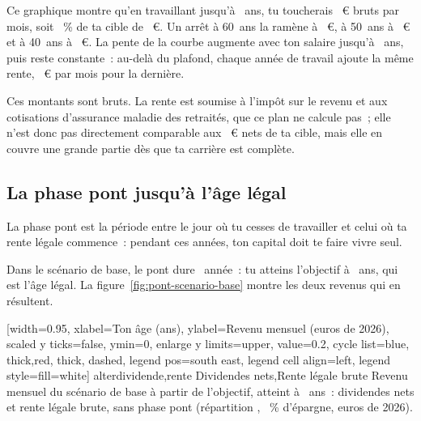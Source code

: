 Ce graphique montre qu'en travaillant jusqu'\`a \AgeLegal~ans, tu toucherais \RenteBeiZielalter~€
bruts par mois, soit \RenteLegalePartCible~\% de ta cible de \ZielMonat~€. Un arr\^et \`a 60~ans la
ram\`ene \`a \RenteArretSechzig~€, \`a 50~ans \`a \RenteArretFuenfzig~€ et \`a 40~ans \`a
\RenteArretVierzig~€. La pente de la courbe augmente avec ton salaire jusqu'\`a \AgePlafondRv~ans,
puis reste constante~: au-del\`a du plafond, chaque ann\'ee de travail ajoute la m\^eme rente,
\RenteDerniereAnnee~€ par mois pour la derni\`ere. 

Ces montants sont bruts. La rente est soumise \`a l'imp\^ot sur le revenu et aux cotisations
d'assurance maladie des retrait\'es, que ce plan ne calcule pas~; elle n'est donc pas directement
comparable aux \ZielMonat~€ nets de ta cible, mais elle en couvre une grande partie d\`es que ta
carri\`ere est compl\`ete.

\subsection{La phase pont jusqu'\`a l'\^age l\'egal}\label{sec:retraite-pont}

La phase pont est la p\'eriode entre le jour o\`u tu cesses de travailler et celui o\`u ta rente
l\'egale commence~: pendant ces ann\'ees, ton capital doit te faire vivre seul.


Dans le sc\'enario de base, le pont dure \BrueckeJahre~ann\'ee~: tu atteins l'objectif \`a
\AlterYannBasis~ans, qui est l'\^age l\'egal. La figure~\ref{fig:pont-scenario-base} montre les deux
revenus qui en r\'esultent.

[width=0.95\linewidth, xlabel={Ton \^age (ans)}, ylabel={Revenu mensuel (euros de 2026)},
  scaled y ticks=false, ymin=0, enlarge y limits={upper, value=0.2},
  cycle list={{blue, thick},{red, thick, dashed}},
  legend pos=south east, legend cell align=left, legend style={fill=white}]%
  {alter}{dividende,rente}%
  {{Dividendes nets},{Rente l\'egale brute}}%
  {Revenu mensuel du sc\'enario de base \`a partir de l'objectif, atteint \`a \AlterYannBasis~ans~:
  dividendes nets et rente l\'egale brute, sans phase pont (r\'epartition \ReferenzStrategie,
  \ReferenzSparquote~\% d'\'epargne, euros de 2026).\label{fig:pont-scenario-base}}

